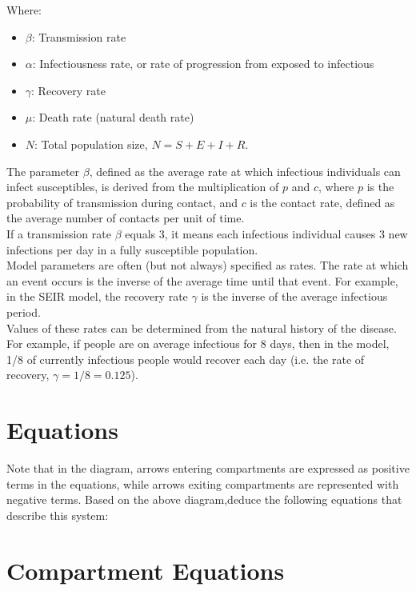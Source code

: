 \documentclass{article}
\begin{document}
Where:
\begin{itemize}
    \item \( \beta \): Transmission rate
    \item \( \alpha \): Infectiousness rate, or rate of progression from exposed to infectious
    \item \( \gamma \): Recovery rate
    \item \( \mu \): Death rate (natural death rate)
    \item \( N \): Total population size, \( N = S + E + I + R \).
\end{itemize}

 The parameter $\beta$, defined as the average rate at which infectious individuals can infect susceptibles,
 is derived from the multiplication of $p$
 and $c$, where $p$ is the probability of transmission during contact, and $c$
 is the contact rate, defined as the average number of contacts per unit of time.\\

 If a transmission rate $\beta$ equals 3, it means
each infectious individual causes 3 new infections per day
in a fully susceptible population.\\

Model parameters are often (but not always) specified as rates.
The rate at which an event occurs is the inverse of the average time until that event.
For example, in the SEIR model, the recovery rate $\gamma$ is the inverse of the average infectious period.\\

Values of these rates can be determined from the natural history of the disease.
For example,  if people are on average infectious for 8 days, then in the model,
1/8 of currently infectious people would recover each day
(i.e. the rate of recovery, $\gamma=1/8=0.125$).

\section{Equations}\label{eqs}
Note that in the diagram, arrows entering compartments are expressed as positive
terms in the equations, while arrows exiting compartments are represented with negative terms.
Based on the above diagram,deduce the following equations that describe this system:

\section*{Compartment Equations}
\end{document}
